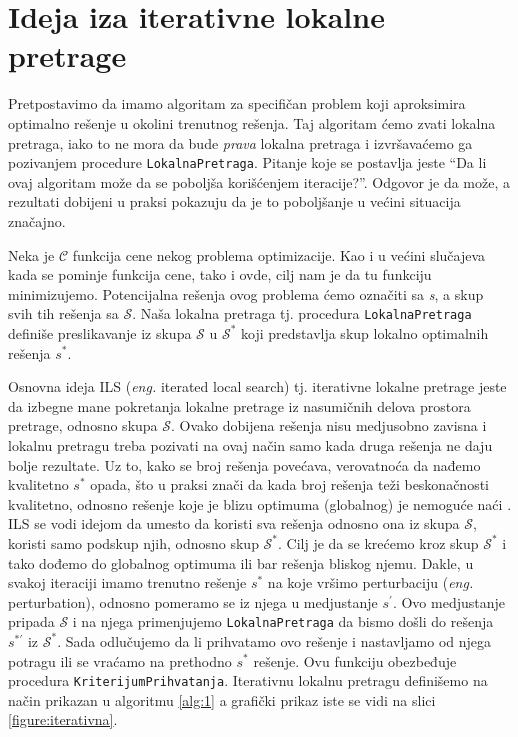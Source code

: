 \documentclass[a4paper]{article}
\newcommand{\q}[1]{``#1''}  %
\newcommand{\s}[0]{\textit{s}} %
\newcommand{\sstar}[0]{$\textit{s}^*$}
\newcommand{\squote}[0]{$\textit{s}^\prime$}
\renewcommand{\S}[0]{$\mathcal{S}$} %
\newcommand{\Sstar}[0]{$\mathcal{S}^{*}$}
\newcommand{\eng}[1]{(\textit{eng.} #1)}
\newcommand{\lokalna}[0]{\small{\texttt{LokalnaPretraga}}}
\newcommand{\kriterijum}[0]{\small{\texttt{KriterijumPrihvatanja}}}
\begin{document}
\section{Ideja iza iterativne lokalne pretrage}
Pretpostavimo da imamo algoritam za specifičan problem koji aproksimira optimalno rešenje u okolini trenutnog rešenja. 
Taj algoritam ćemo zvati lokalna pretraga, iako to ne mora da bude \textit{prava} lokalna pretraga i  
izvršavaćemo ga pozivanjem procedure \lokalna{}. Pitanje koje se postavlja jeste \q{Da li 
ovaj algoritam može da se poboljša korišćenjem iteracije?}. Odgovor je da može, a rezultati dobijeni u praksi pokazuju 
da je to poboljšanje u većini situacija značajno.\footnotemark
{} 
\newline

Neka je $\mathcal{C}$ funkcija cene nekog problema optimizacije. Kao i u većini slučajeva kada se pominje funkcija cene,
tako i ovde, cilj nam je da tu funkciju minimizujemo. Potencijalna rešenja ovog problema ćemo označiti sa \s{}, 
a skup svih tih rešenja sa \S{}. Naša lokalna pretraga tj. procedura \lokalna{} definiše preslikavanje 
iz skupa \S{} u \Sstar{} koji predstavlja skup lokalno optimalnih rešenja \sstar{}.
\newline

Osnovna ideja ILS \eng{iterated local search} tj. iterativne lokalne pretrage jeste da izbegne mane pokretanja lokalne pretrage iz nasumičnih delova prostora pretrage, 
odnosno skupa \S{}. Ovako dobijena rešenja nisu medjusobno zavisna i lokalnu pretragu treba pozivati na ovaj način samo kada druga rešenja ne daju bolje rezultate.\footnotemark
{} 
Uz to, kako se broj rešenja povećava, verovatnoća da nađemo kvalitetno \sstar{} opada, što u praksi znači da kada broj rešenja teži beskonačnosti kvalitetno, odnosno rešenje koje je blizu optimuma (globalnog) je 
nemoguće naći \cite{handbookOfMetaheuristics}. ILS se vodi idejom da umesto da koristi sva rešenja odnosno ona iz skupa \S{}, koristi samo podskup njih, odnosno skup \Sstar{}. 
Cilj je da se krećemo kroz skup \Sstar{} i tako dođemo do globalnog optimuma ili bar rešenja bliskog njemu.
Dakle, u svakoj iteraciji imamo trenutno rešenje \sstar{} na koje vršimo perturbaciju \eng{perturbation}, odnosno pomeramo se iz njega u medjustanje 
\squote{}. Ovo medjustanje pripada \S{} i na njega primenjujemo \lokalna{} da bismo došli do rešenja $\textit{s}^{*\prime}$ iz \Sstar{}. Sada odlučujemo da li prihvatamo ovo rešenje i nastavljamo od njega potragu ili 
se vraćamo na prethodno \sstar{} rešenje. Ovu funkciju obezbeđuje procedura \kriterijum{}.
Iterativnu lokalnu pretragu definišemo na način prikazan u algoritmu \ref{alg:1} a grafički prikaz iste se vidi na slici \ref{figure:iterativna}.
\end{document}

